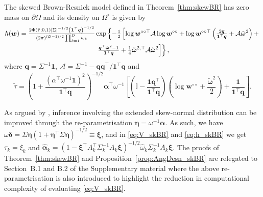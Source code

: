 \documentclass[lineno]{biometrika}
\begin{document}
\begin{proposition}
\label{prop:AngDesn_skBR}
The skewed Brown-Resnick model defined in Theorem~\ref{thm:skewBR} has zero mass on $\partial\Omega$ and its density on $\Omega^\circ$ is given by
%
\begin{multline}
\label{eq:h_skBR}
h(\bm w) ={\textstyle{2\Phi(\tilde{\tau};0,1)| \Sigma |^{-1/2} \left( \bm 1^\top \bm q\right)^{-1/2}\over\left( 2\pi \right)^{(D-1)/2}\prod_{k=1}^D w_k}}\exp \left\{ -{\textstyle{1\over2}} \left[ \log \bm w^{\circ\circ\top} \mathcal{A} \log \bm w^{\circ\circ} + \log \bm w^{\circ\circ\top} \left( {\textstyle{2 \bm q\over\bm 1^\top \bm q}} + {\mathcal A}\tilde{\bm\omega}^2\right) + \right.\right. \\ 
\left.\left. {\textstyle{\bm q^\top\tilde{\bm \omega}^2 - 1\over\bm 1 ^\top \bm q}} + {\textstyle{1\over4}}\tilde{\bm\omega}^{2,\top}{\mathcal A}\tilde{\bm\omega}^2 \right]\right\},
\end{multline}%
where $\bm q = \Sigma^{-1} \bm 1$, $\mathcal{A} = \Sigma^{-1} - \bm q \bm q^\top / \bm 1^\top \bm q$ and  
$$\tilde{\tau}=\left(1 + \frac{\left(\alpha^\top\omega^{-1}\bm 1\right)^2}{\bm 1^\top \bm q} \right)^{-1/2} \bm\alpha^\top\omega^{-1}\left[\left(\mathbb{I} - \frac{\bm 1\bm q^\top}{\bm 1^\top \bm q}\right)\left(\log \bm w^{\circ\circ} + \frac{\tilde{\bm\omega}^2}{2}\right) +  \frac{\bm 1}{\bm 1^\top\bm q}  \right].$$
\end{proposition}

As argued by \citet[][Section~5.2]{Azzalini:2013}, inference involving the extended skew-normal distribution can be improved through the re-parametrisation $\bm \eta = \omega^{-1} \bm \alpha$. As such, we have $\omega \bm \delta = \Sigma \bm \eta \left( 1+\bm \eta^\top \Sigma \bm \eta\right)^{-1/2} \equiv \bm \xi$, and in \eqref{eq:V_skBR} and \eqref{eq:h_skBR} we get $\tau_k = \xi_k$ and $\hat{\bm\alpha}_k = \left(1-\bm\xi^\top A_k^\top\Sigma_k^{-1} A_k \bm\xi \right)^{-1/2} \hat{ \omega}_k\Sigma_k^{-1}A_k \bm\xi$. The proofs of Theorem~\ref{thm:skewBR} and Proposition~\ref{prop:AngDesn_skBR} are relegated to Section~B.1 and B.2 of the Supplementary material where the above re-parametrisation is also introduced to highlight the reduction in computational complexity of evaluating \eqref{eq:V_skBR}.
\end{document}
